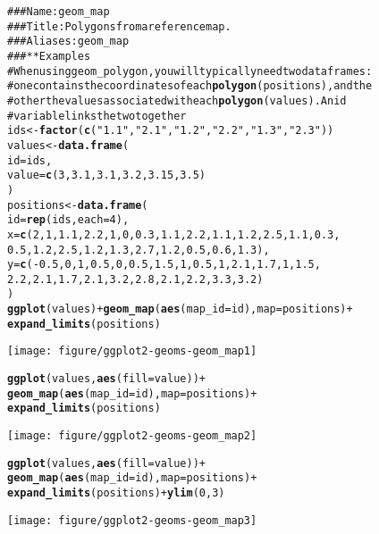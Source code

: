 \documentclass[a4paper,titlepage]{tufte-handout}\usepackage{graphicx, color}
\makeatletter
\def\maxwidth{ %
  \ifdim\Gin@nat@width>\linewidth
    \linewidth
  \else
    \Gin@nat@width
  \fi
}
\newcommand{\hlfunctioncall}[1]{\textcolor[rgb]{0.501960784313725,0,0.329411764705882}{\textbf{#1}}}%
\newcommand{\hlstring}[1]{\textcolor[rgb]{0.6,0.6,1}{#1}}%
\newcommand{\hlcomment}[1]{\textcolor[rgb]{0.180392156862745,0.6,0.341176470588235}{#1}}%
\newenvironment{kframe}{%
 \def\at@end@of@kframe{}%
 \ifinner\ifhmode%
  \def\at@end@of@kframe{\end{minipage}}%
  \begin{minipage}{\columnwidth}%
 \fi\fi%
 \def\FrameCommand##1{\hskip\@totalleftmargin \hskip-\fboxsep
 \colorbox{shadecolor}{##1}\hskip-\fboxsep
     \hskip-\linewidth \hskip-\@totalleftmargin \hskip\columnwidth}%
 \MakeFramed {\advance\hsize-\width
   \@totalleftmargin\z@ \linewidth\hsize
   \@setminipage}}%
 {\par\unskip\endMakeFramed%
 \at@end@of@kframe}
\newenvironment{knitrout}{}{} %
\makeatother
\begin{document}
\begin{knitrout}
\color{fgcolor}\begin{kframe}
\begin{alltt}
\hlcomment{### Name: geom_map}
\hlcomment{### Title: Polygons from a reference map.}
\hlcomment{### Aliases: geom_map}
\hlcomment{### ** Examples}
\hlcomment{# When using geom_polygon, you will typically need two data frames:}
\hlcomment{# one contains the coordinates of each \hlfunctioncall{polygon} (positions),  and the}
\hlcomment{# other the values associated with each \hlfunctioncall{polygon} (values).  An id}
\hlcomment{# variable links the two together}
ids <- \hlfunctioncall{factor}(\hlfunctioncall{c}(\hlstring{"1.1"}, \hlstring{"2.1"}, \hlstring{"1.2"}, \hlstring{"2.2"}, \hlstring{"1.3"}, \hlstring{"2.3"}))
values <- \hlfunctioncall{data.frame}(
  id = ids,
  value = \hlfunctioncall{c}(3, 3.1, 3.1, 3.2, 3.15, 3.5)
)
positions <- \hlfunctioncall{data.frame}(
  id = \hlfunctioncall{rep}(ids, each = 4),
  x = \hlfunctioncall{c}(2, 1, 1.1, 2.2, 1, 0, 0.3, 1.1, 2.2, 1.1, 1.2, 2.5, 1.1, 0.3,
  0.5, 1.2, 2.5, 1.2, 1.3, 2.7, 1.2, 0.5, 0.6, 1.3),
  y = \hlfunctioncall{c}(-0.5, 0, 1, 0.5, 0, 0.5, 1.5, 1, 0.5, 1, 2.1, 1.7, 1, 1.5,
  2.2, 2.1, 1.7, 2.1, 3.2, 2.8, 2.1, 2.2, 3.3, 3.2)
)
\hlfunctioncall{ggplot}(values) + \hlfunctioncall{geom_map}(\hlfunctioncall{aes}(map_id = id), map = positions) +
  \hlfunctioncall{expand_limits}(positions)
\end{alltt}
\end{kframe}\texttt{[image: figure/ggplot2-geoms-geom\_map1]} \begin{kframe}\begin{alltt}
\hlfunctioncall{ggplot}(values, \hlfunctioncall{aes}(fill = value)) +
  \hlfunctioncall{geom_map}(\hlfunctioncall{aes}(map_id = id), map = positions) +
  \hlfunctioncall{expand_limits}(positions)
\end{alltt}
\end{kframe}\texttt{[image: figure/ggplot2-geoms-geom\_map2]} \begin{kframe}\begin{alltt}
\hlfunctioncall{ggplot}(values, \hlfunctioncall{aes}(fill = value)) +
  \hlfunctioncall{geom_map}(\hlfunctioncall{aes}(map_id = id), map = positions) +
  \hlfunctioncall{expand_limits}(positions) + \hlfunctioncall{ylim}(0, 3)
\end{alltt}
\end{kframe}\texttt{[image: figure/ggplot2-geoms-geom\_map3]} \begin{kframe}\begin{alltt}

\end{alltt}
\end{kframe}
\end{knitrout}
\end{document}
